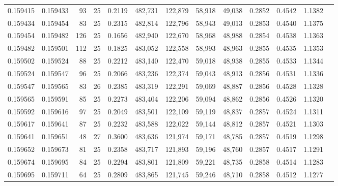 \begin{tabular}{rrrrrrrrrrrrr}
0.159415 & 0.159433 &    93 &  25 &                                     0.2119 & 482,731 & 122,879 &  58,918 &  49,038 & 0.2852 & 0.4542 & 1.1382 \\
0.159434 & 0.159454 &    83 &  25 &                                     0.2315 & 482,814 & 122,796 &  58,943 &  49,013 & 0.2853 & 0.4540 & 1.1375 \\
0.159454 & 0.159482 &   126 &  25 &                                     0.1656 & 482,940 & 122,670 &  58,968 &  48,988 & 0.2854 & 0.4538 & 1.1363 \\
0.159482 & 0.159501 &   112 &  25 &                                     0.1825 & 483,052 & 122,558 &  58,993 &  48,963 & 0.2855 & 0.4535 & 1.1353 \\
0.159502 & 0.159524 &    88 &  25 &                                     0.2212 & 483,140 & 122,470 &  59,018 &  48,938 & 0.2855 & 0.4533 & 1.1344 \\
0.159524 & 0.159547 &    96 &  25 &                                     0.2066 & 483,236 & 122,374 &  59,043 &  48,913 & 0.2856 & 0.4531 & 1.1336 \\
0.159547 & 0.159565 &    83 &  26 &                                     0.2385 & 483,319 & 122,291 &  59,069 &  48,887 & 0.2856 & 0.4528 & 1.1328 \\
0.159565 & 0.159591 &    85 &  25 &                                     0.2273 & 483,404 & 122,206 &  59,094 &  48,862 & 0.2856 & 0.4526 & 1.1320 \\
0.159592 & 0.159616 &    97 &  25 &                                     0.2049 & 483,501 & 122,109 &  59,119 &  48,837 & 0.2857 & 0.4524 & 1.1311 \\
0.159617 & 0.159641 &    87 &  25 &                                     0.2232 & 483,588 & 122,022 &  59,144 &  48,812 & 0.2857 & 0.4521 & 1.1303 \\
0.159641 & 0.159651 &    48 &  27 &                                     0.3600 & 483,636 & 121,974 &  59,171 &  48,785 & 0.2857 & 0.4519 & 1.1298 \\
0.159652 & 0.159673 &    81 &  25 &                                     0.2358 & 483,717 & 121,893 &  59,196 &  48,760 & 0.2857 & 0.4517 & 1.1291 \\
0.159674 & 0.159695 &    84 &  25 &                                     0.2294 & 483,801 & 121,809 &  59,221 &  48,735 & 0.2858 & 0.4514 & 1.1283 \\
0.159695 & 0.159711 &    64 &  25 &                                     0.2809 & 483,865 & 121,745 &  59,246 &  48,710 & 0.2858 & 0.4512 & 1.1277 \\

\end{tabular}
